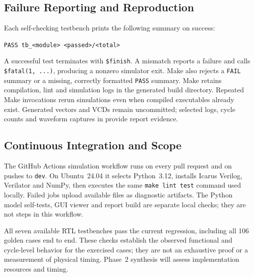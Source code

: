 \subsection{Failure Reporting and Reproduction}
Each self-checking testbench prints the following summary on success:
\begin{center}
\small\verb|PASS tb_<module> <passed>/<total>|
\end{center}
A successful test terminates with \verb|$finish|. A mismatch reports a
failure and calls
\verb|$fatal(1, ...)|, producing a nonzero simulator exit. Make also rejects
a \texttt{FAIL} summary or a missing, correctly formatted \texttt{PASS}
summary. Make retains compilation, lint and simulation logs in the
generated build directory. Repeated Make invocations rerun simulations even when
compiled executables already exist. Generated vectors and VCDs remain
uncommitted; selected logs, cycle counts and waveform captures in
 provide report evidence.

\subsection{Continuous Integration and Scope}
The GitHub Actions simulation workflow runs on every pull request and on
pushes to \texttt{dev}. On Ubuntu~24.04 it selects Python~3.12, installs
Icarus Verilog, Verilator and NumPy, then executes the same
\texttt{make lint test} command used locally. Failed jobs upload available
 files as diagnostic artifacts. The Python model
self-tests, GUI viewer and report build are separate local checks; they
are not steps in this workflow.

All seven available RTL testbenches pass the current regression,
including all 106 golden cases end to end. These checks establish the
observed functional and cycle-level behavior for the exercised cases;
they are not an exhaustive proof or a measurement of physical timing.
Phase~2 synthesis will assess implementation resources and timing.

